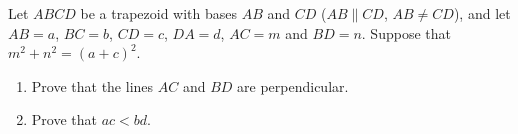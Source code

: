 Let $ABCD$ be a trapezoid with bases $AB$ and $CD$ ($AB\parallel CD$, $AB\ne CD$), and let $AB=a$, $BC=b$, $CD=c$, $DA=d$, $AC=m$ and $BD=n$. Suppose that $m^2+n^2=(a+c)^2$.
\begin{enumerate}
\item[(a)] Prove that the lines $AC$ and $BD$ are perpendicular.
\item[(b)] Prove that $ac<bd$.
\end{enumerate}
